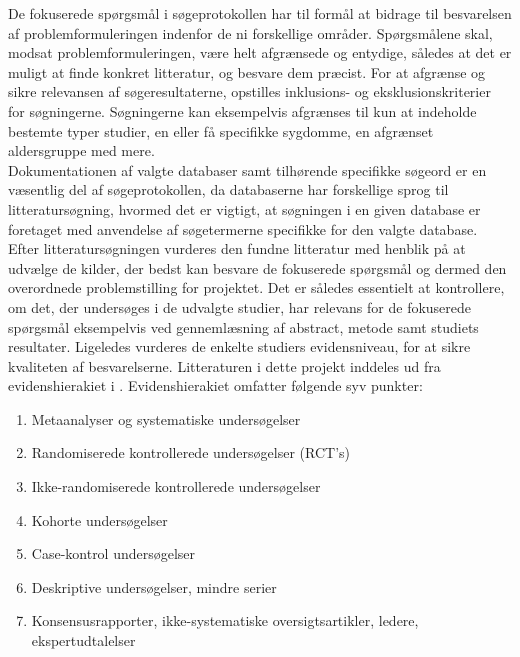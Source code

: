 De fokuserede spørgsmål i søgeprotokollen har til formål at bidrage til besvarelsen af problemformuleringen indenfor de ni forskellige områder. Spørgsmålene skal, modsat problemformuleringen, være helt afgrænsede og entydige, således at det er muligt at finde konkret litteratur, og besvare dem præcist. \citep{metodehaandbogen}  
For at afgrænse og sikre relevansen af søgeresultaterne, opstilles inklusions- og eksklusionskriterier for søgningerne. Søgningerne kan eksempelvis afgrænses til kun at indeholde bestemte typer studier, en eller få specifikke sygdomme, en afgrænset aldersgruppe med mere. \citep{metodehaandbogen}\\
Dokumentationen af valgte databaser samt tilhørende specifikke søgeord er en væsentlig del af søgeprotokollen, da databaserne har forskellige sprog til litteratursøgning, hvormed det er vigtigt, at søgningen i en given database er foretaget med anvendelse af søgetermerne specifikke for den valgte database. \citep{metodehaandbogen}
Efter litteratursøgningen vurderes den fundne litteratur med henblik på at udvælge de kilder, der bedst kan besvare de fokuserede spørgsmål og dermed den overordnede problemstilling for projektet. Det er således essentielt at kontrollere, om det, der undersøges i de udvalgte studier, har relevans for de fokuserede spørgsmål eksempelvis ved gennemlæsning af abstract, metode samt studiets resultater. Ligeledes vurderes de enkelte studiers evidensniveau, for at sikre kvaliteten af besvarelserne. \citep{metodehaandbogen} 
Litteraturen i dette projekt inddeles ud fra evidenshierakiet i \cite{metodehaandbogen}. Evidenshierakiet omfatter følgende syv punkter: 

\begin{enumerate}
\item Metaanalyser og systematiske undersøgelser 
\item Randomiserede kontrollerede undersøgelser (RCT’s)
\item Ikke-randomiserede kontrollerede undersøgelser
\item Kohorte undersøgelser
\item Case-kontrol undersøgelser
\item Deskriptive undersøgelser, mindre serier
\item Konsensusrapporter, ikke-systematiske oversigtsartikler, ledere, ekspertudtalelser
\end{enumerate}

